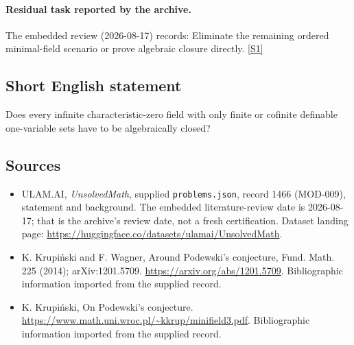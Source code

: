 \documentclass[11pt,a4paper]{article}
\newcommand{\sref}[2]{\hyperlink{source:#1:#2}{[S#2]}}
\begin{document}
\paragraph{Residual task reported by the archive.}

The embedded review (2026-08-17) records: Eliminate the remaining ordered minimal-field scenario or prove algebraic closure directly. \sref{1466}{1}

\subsection{Short English statement}

Does every infinite characteristic-zero field with only finite or cofinite definable one-variable sets have to be algebraically closed?

\subsection{Sources}

{\small

\begin{itemize}

\item[\hypertarget{source:1466:1}{S1}] ULAM.AI, \emph{UnsolvedMath}, supplied \texttt{problems.json}, record 1466 (MOD-009), statement and background. The embedded literature-review date is 2026-08-17; that is the archive’s review date, not a fresh certification. Dataset landing page: \url{https://huggingface.co/datasets/ulamai/UnsolvedMath}.

\item[\hypertarget{source:1466:2}{S2}] K. Krupiński and F. Wagner, Around Podewski's conjecture, Fund. Math. 225 (2014); arXiv:1201.5709. \url{https://arxiv.org/abs/1201.5709}. Bibliographic information imported from the supplied record.

\item[\hypertarget{source:1466:3}{S3}] K. Krupiński, On Podewski's conjecture. \url{https://www.math.uni.wroc.pl/~kkrup/minifield3.pdf}. Bibliographic information imported from the supplied record.

\end{itemize}

}

\label{end:1466}
\end{document}
